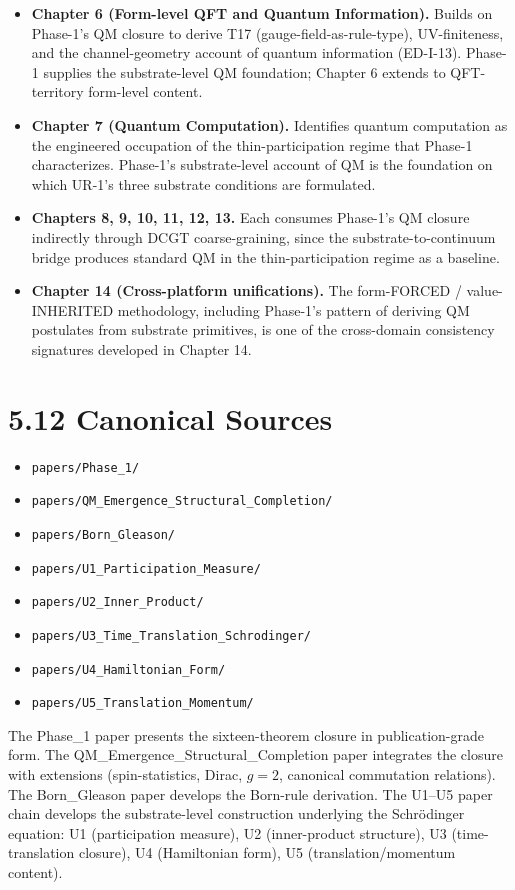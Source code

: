 \documentclass[11pt]{book}
\begin{document}
\begin{itemize}
\item \textbf{Chapter 6 (Form-level QFT and Quantum Information).} Builds on Phase-1's QM closure to derive T17 (gauge-field-as-rule-type), UV-finiteness, and the channel-geometry account of quantum information (ED-I-13). Phase-1 supplies the substrate-level QM foundation; Chapter 6 extends to QFT-territory form-level content.
\item \textbf{Chapter 7 (Quantum Computation).} Identifies quantum computation as the engineered occupation of the thin-participation regime that Phase-1 characterizes. Phase-1's substrate-level account of QM is the foundation on which UR-1's three substrate conditions are formulated.
\item \textbf{Chapters 8, 9, 10, 11, 12, 13.} Each consumes Phase-1's QM closure indirectly through DCGT coarse-graining, since the substrate-to-continuum bridge produces standard QM in the thin-participation regime as a baseline.
\item \textbf{Chapter 14 (Cross-platform unifications).} The form-FORCED / value-INHERITED methodology, including Phase-1's pattern of deriving QM postulates from substrate primitives, is one of the cross-domain consistency signatures developed in Chapter 14.
\end{itemize}

\section{5.12 Canonical Sources}

\begin{itemize}
\item \texttt{papers/Phase\_1/}
\item \texttt{papers/QM\_Emergence\_Structural\_Completion/}
\item \texttt{papers/Born\_Gleason/}
\item \texttt{papers/U1\_Participation\_Measure/}
\item \texttt{papers/U2\_Inner\_Product/}
\item \texttt{papers/U3\_Time\_Translation\_Schrodinger/}
\item \texttt{papers/U4\_Hamiltonian\_Form/}
\item \texttt{papers/U5\_Translation\_Momentum/}
\end{itemize}

The Phase\_1 paper presents the sixteen-theorem closure in publication-grade form. The QM\_Emergence\_Structural\_Completion paper integrates the closure with extensions (spin-statistics, Dirac, $g=2$, canonical commutation relations). The Born\_Gleason paper develops the Born-rule derivation. The U1–U5 paper chain develops the substrate-level construction underlying the Schrödinger equation: U1 (participation measure), U2 (inner-product structure), U3 (time-translation closure), U4 (Hamiltonian form), U5 (translation/momentum content).
\end{document}
